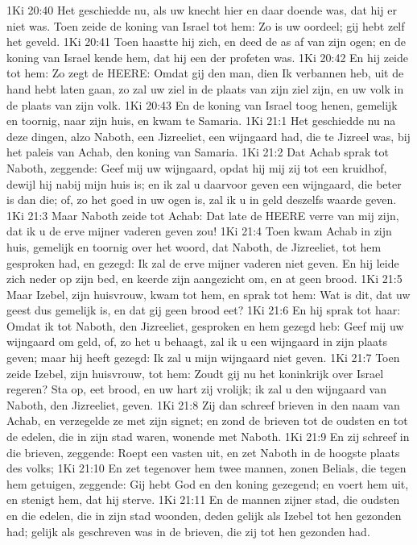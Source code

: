 1Ki 20:40  Het geschiedde nu, als uw knecht hier en daar doende was, dat hij er niet was. Toen zeide de koning van Israel tot hem: Zo is uw oordeel; gij hebt zelf het geveld.
1Ki 20:41  Toen haastte hij zich, en deed de as af van zijn ogen; en de koning van Israel kende hem, dat hij een der profeten was.
1Ki 20:42  En hij zeide tot hem: Zo zegt de HEERE: Omdat gij den man, dien Ik verbannen heb, uit de hand hebt laten gaan, zo zal uw ziel in de plaats van zijn ziel zijn, en uw volk in de plaats van zijn volk.
1Ki 20:43  En de koning van Israel toog henen, gemelijk en toornig, naar zijn huis, en kwam te Samaria.
1Ki 21:1  Het geschiedde nu na deze dingen, alzo Naboth, een Jizreeliet, een wijngaard had, die te Jizreel was, bij het paleis van Achab, den koning van Samaria.
1Ki 21:2  Dat Achab sprak tot Naboth, zeggende: Geef mij uw wijngaard, opdat hij mij zij tot een kruidhof, dewijl hij nabij mijn huis is; en ik zal u daarvoor geven een wijngaard, die beter is dan die; of, zo het goed in uw ogen is, zal ik u in geld deszelfs waarde geven.
1Ki 21:3  Maar Naboth zeide tot Achab: Dat late de HEERE verre van mij zijn, dat ik u de erve mijner vaderen geven zou!
1Ki 21:4  Toen kwam Achab in zijn huis, gemelijk en toornig over het woord, dat Naboth, de Jizreeliet, tot hem gesproken had, en gezegd: Ik zal de erve mijner vaderen niet geven. En hij leide zich neder op zijn bed, en keerde zijn aangezicht om, en at geen brood.
1Ki 21:5  Maar Izebel, zijn huisvrouw, kwam tot hem, en sprak tot hem: Wat is dit, dat uw geest dus gemelijk is, en dat gij geen brood eet?
1Ki 21:6  En hij sprak tot haar: Omdat ik tot Naboth, den Jizreeliet, gesproken en hem gezegd heb: Geef mij uw wijngaard om geld, of, zo het u behaagt, zal ik u een wijngaard in zijn plaats geven; maar hij heeft gezegd: Ik zal u mijn wijngaard niet geven.
1Ki 21:7  Toen zeide Izebel, zijn huisvrouw, tot hem: Zoudt gij nu het koninkrijk over Israel regeren? Sta op, eet brood, en uw hart zij vrolijk; ik zal u den wijngaard van Naboth, den Jizreeliet, geven.
1Ki 21:8  Zij dan schreef brieven in den naam van Achab, en verzegelde ze met zijn signet; en zond de brieven tot de oudsten en tot de edelen, die in zijn stad waren, wonende met Naboth.
1Ki 21:9  En zij schreef in die brieven, zeggende: Roept een vasten uit, en zet Naboth in de hoogste plaats des volks;
1Ki 21:10  En zet tegenover hem twee mannen, zonen Belials, die tegen hem getuigen, zeggende: Gij hebt God en den koning gezegend; en voert hem uit, en stenigt hem, dat hij sterve.
1Ki 21:11  En de mannen zijner stad, die oudsten en die edelen, die in zijn stad woonden, deden gelijk als Izebel tot hen gezonden had; gelijk als geschreven was in de brieven, die zij tot hen gezonden had.
